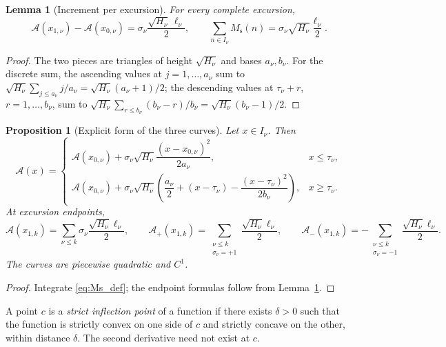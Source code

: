 \documentclass[11pt]{amsart}
\numberwithin{equation}{section}
\theoremstyle{plain}
\newtheorem{proposition}[theorem]{Proposition}
\newtheorem{lemma}[theorem]{Lemma}
\theoremstyle{definition}
\theoremstyle{remark}
\newcommand{\Ms}{M_{\mathrm{s}}}
\newcommand{\Ap}{\mathcal{A}_{+}}
\newcommand{\Am}{\mathcal{A}_{-}}
\newcommand{\Anet}{\mathcal{A}}
\begin{document}
\begin{lemma}[Increment per excursion]
\label{lem:jump}
For every complete excursion,
\begin{equation}
\label{eq:jump}
\Anet(x_{1,\nu})-\Anet(x_{0,\nu})
=\sigma_\nu\frac{\sqrt{H_\nu}\,\ell_\nu}{2},
\qquad
\sum_{n\in I_\nu}\Ms(n)
=\sigma_\nu\sqrt{H_\nu}\frac{\ell_\nu}{2}.
\end{equation}
\end{lemma}

\begin{proof}
The two pieces are triangles of height $\sqrt{H_\nu}$ and bases $a_\nu,b_\nu$.
For the discrete sum, the ascending values at $j=1,\ldots,a_\nu$ sum to
$\sqrt{H_\nu}\sum_{j\le a_\nu}j/a_\nu=\sqrt{H_\nu}(a_\nu+1)/2$; the
descending values at $\tau_\nu+r$, $r=1,\ldots,b_\nu$, sum to
$\sqrt{H_\nu}\sum_{r\le b_\nu}(b_\nu-r)/b_\nu=\sqrt{H_\nu}(b_\nu-1)/2$.
\end{proof}

\begin{proposition}[Explicit form of the three curves]
\label{prop:explicit}
Let $x\in I_\nu$. Then
\begin{equation}
\label{eq:explicit_A}
\Anet(x)=
\begin{cases}
\Anet(x_{0,\nu})+\sigma_\nu\sqrt{H_\nu}
\dfrac{(x-x_{0,\nu})^2}{2a_\nu},&x\le\tau_\nu,\\[2ex]
\Anet(x_{0,\nu})+\sigma_\nu\sqrt{H_\nu}
\left(\dfrac{a_\nu}{2}+(x-\tau_\nu)-
\dfrac{(x-\tau_\nu)^2}{2b_\nu}\right),&x\ge\tau_\nu.
\end{cases}
\end{equation}
At excursion endpoints,
\begin{equation}
\label{eq:explicit_net}
\Anet(x_{1,k})=\sum_{\nu\le k}\sigma_\nu\frac{\sqrt{H_\nu}\ell_\nu}{2},\qquad
\Ap(x_{1,k})=\sum_{\substack{\nu\le k\\\sigma_\nu=+1}}
\frac{\sqrt{H_\nu}\ell_\nu}{2},\qquad
\Am(x_{1,k})=-\sum_{\substack{\nu\le k\\\sigma_\nu=-1}}
\frac{\sqrt{H_\nu}\ell_\nu}{2}.
\end{equation}
The curves are piecewise quadratic and $C^1$.
\end{proposition}

\begin{proof}
Integrate \eqref{eq:Ms_def}; the endpoint formulas follow from
Lemma~\ref{lem:jump}.
\end{proof}

A point $c$ is a \emph{strict inflection point} of a function if there
exists $\delta>0$ such that the function is strictly convex on one side of
$c$ and strictly concave on the other, within distance $\delta$. The second
derivative need not exist at $c$.
\end{document}
